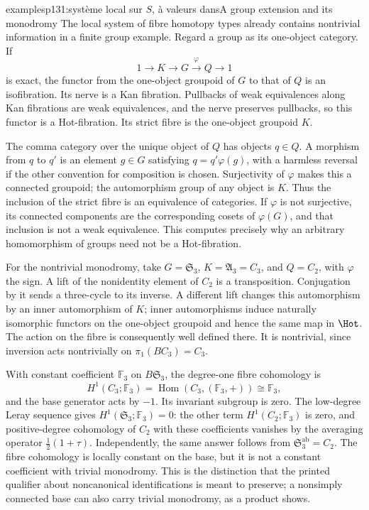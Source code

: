 \begin{dcomment}{examples}{p131:système local sur $S$, à valeurs dans}{A group extension and its monodromy}
The local system of fibre homotopy types already contains nontrivial information in a finite group example. Regard a group as its one-object category. If
\[
 1\longrightarrow K\longrightarrow G
 \xrightarrow{\varphi}Q\longrightarrow1
\]
is exact, the functor from the one-object groupoid of \(G\) to that of \(Q\) is an isofibration. Its nerve is a Kan fibration. Pullbacks of weak equivalences along Kan fibrations are weak equivalences, and the nerve preserves pullbacks, so this functor is a Hot-fibration. Its strict fibre is the one-object groupoid \(K\).

The comma category over the unique object of \(Q\) has objects \(q\in Q\). A morphism from \(q\) to \(q'\) is an element \(g\in G\) satisfying \(q=q'\varphi(g)\), with a harmless reversal if the other convention for composition is chosen. Surjectivity of \(\varphi\) makes this a connected groupoid; the automorphism group of any object is \(K\). Thus the inclusion of the strict fibre is an equivalence of categories. If \(\varphi\) is not surjective, its connected components are the corresponding cosets of \(\varphi(G)\), and that inclusion is not a weak equivalence. This computes precisely why an arbitrary homomorphism of groups need not be a Hot-fibration.

For the nontrivial monodromy, take \(G=\mathfrak S_3\), \(K=\mathfrak A_3=C_3\), and \(Q=C_2\), with \(\varphi\) the sign. A lift of the nonidentity element of \(C_2\) is a transposition. Conjugation by it sends a three-cycle to its inverse. A different lift changes this automorphism by an inner automorphism of \(K\); inner automorphisms induce naturally isomorphic functors on the one-object groupoid and hence the same map in \(\Hot\). The action on the fibre is consequently well defined there. It is nontrivial, since inversion acts nontrivially on \(\pi_1(BC_3)=C_3\).

With constant coefficient \(\mathbb F_3\) on \(B\mathfrak S_3\), the degree-one fibre cohomology is
\[
 H^1(C_3;\mathbb F_3)
 =\operatorname{Hom}(C_3,(\mathbb F_3,+))
 \cong\mathbb F_3,
\]
and the base generator acts by \(-1\). Its invariant subgroup is zero. The low-degree Leray sequence gives \(H^1(\mathfrak S_3;\mathbb F_3)=0\): the other term \(H^1(C_2;\mathbb F_3)\) is zero, and positive-degree cohomology of \(C_2\) with these coefficients vanishes by the averaging operator \(\frac12(1+\tau)\). Independently, the same answer follows from \(\mathfrak S_3^{\mathrm{ab}}=C_2\). The fibre cohomology is locally constant on the base, but it is not a constant coefficient with trivial monodromy. This is the distinction that the printed qualifier about noncanonical identifications is meant to preserve; a nonsimply connected base can also carry trivial monodromy, as a product shows.
\end{dcomment}

